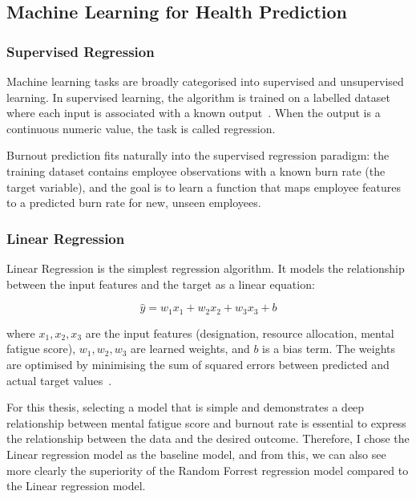 \documentclass[12pt,a4paper]{article}
\begin{document}
\subsection{Machine Learning for Health Prediction}

\subsubsection{Supervised Regression}

Machine learning tasks are broadly categorised into supervised and
unsupervised learning. In supervised learning, the algorithm is trained on
a labelled dataset where each input is associated with a known
output~\cite{bishop2006}. When the output is a continuous numeric value,
the task is called regression.

Burnout prediction fits naturally into the supervised regression paradigm:
the training dataset contains employee observations with a known burn rate
(the target variable), and the goal is to learn a function that maps
employee features to a predicted burn rate for new, unseen employees.

\subsubsection{Linear Regression}

Linear Regression is the simplest regression algorithm. It models the
relationship between the input features and the target as a linear
equation:

\begin{equation}
  \hat{y} = w_1 x_1 + w_2 x_2 + w_3 x_3 + b
  \label{eq:linear-regression}
\end{equation}

\noindent where $x_1, x_2, x_3$ are the input features (designation,
resource allocation, mental fatigue score), $w_1, w_2, w_3$ are learned
weights, and $b$ is a bias term. The weights are optimised by minimising
the sum of squared errors between predicted and actual target
values~\cite{hastie2009}.

For this thesis, selecting a model that is simple and demonstrates a deep relationship between mental fatigue score and burnout rate is essential to express the relationship between the data and the desired outcome. Therefore, I chose the Linear regression model as the baseline model, and from this, we can also see more clearly the superiority of the Random Forrest regression model compared to the Linear regression model.
\end{document}
